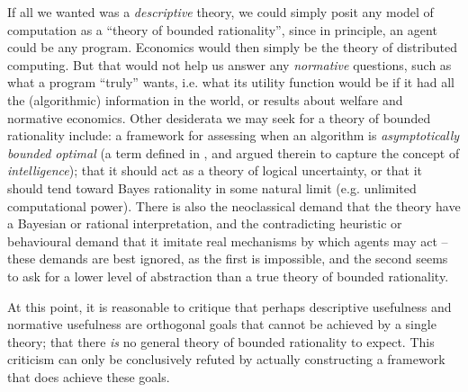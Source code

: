 If all we wanted was a \emph{descriptive} theory, we could simply posit any model of computation as a ``theory of bounded rationality'', since in principle, an agent could be any program. Economics would then simply be the theory of distributed computing. But that would not help us answer any \emph{normative} questions, such as what a program ``truly'' wants, i.e. what its utility function would be if it had all the (algorithmic) information in the world, or results about welfare and normative economics. Other desiderata we may seek for a theory of bounded rationality include: a framework for assessing when an algorithm is \emph{asymptotically bounded optimal} (a term defined in \cite{bounded_optimality_intelligence}, and argued therein to capture the concept of \emph{intelligence}); that it should act as a theory of logical uncertainty, or that it should tend toward Bayes rationality in some natural limit (e.g. unlimited computational power). There is also the neoclassical demand \cite{oldreview_arrow} that the theory have a Bayesian or rational interpretation, and the contradicting heuristic or behavioural demand \cite{oldreview_gigerenzer} that it imitate real mechanisms by which agents may act -- these demands are best ignored, as the first is impossible, and the second seems to ask for a lower level of abstraction than a true theory of bounded rationality.

At this point, it is reasonable to critique that perhaps descriptive usefulness and normative usefulness are orthogonal goals that cannot be achieved by a single theory; that there \emph{is} no general theory of bounded rationality to expect. This criticism can only be conclusively refuted by actually constructing a framework that does achieve these goals.